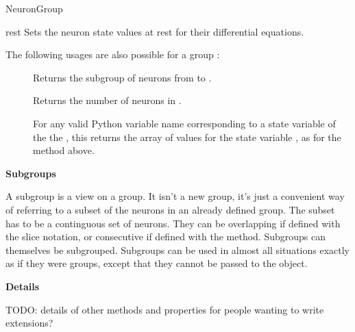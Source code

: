 \documentclass[letterpaper,10pt,english]{manual}
\begin{document}
\begin{classdesc}{NeuronGroup}
\hypertarget{brian.NeuronGroup.rest}{}\begin{methoddesc}{rest}{}
Sets the neuron state values at rest for their differential
equations.
\end{methoddesc}

The following usages are also possible for a group :
\begin{description}
\item[]
Returns the subgroup of neurons from  to .

\item[]
Returns the number of neurons in .

\item[]
For any valid Python variable name  corresponding to
a state variable of the the \hyperlink{brian.NeuronGroup}{}, this
returns the array of values for the state
variable , as for the \hyperlink{brian.NeuronGroup.state}{} method
above.

\end{description}

\textbf{Subgroups}

A subgroup is a view on a group. It isn't a new group, it's just
a convenient way of referring to a subset of the neurons in an
already defined group. The subset has to be a continguous set of
neurons. They can be overlapping if defined with the slice
notation, or consecutive if defined with the \hyperlink{brian.NeuronGroup.subgroup}{} method.
Subgroups can themselves be subgrouped. Subgroups can be used in
almost all situations exactly as if they were groups, except that
they cannot be passed to the \hyperlink{brian.Network}{} object.

\textbf{Details}

TODO: details of other methods and properties for people
wanting to write extensions?
\end{classdesc}
\end{document}
